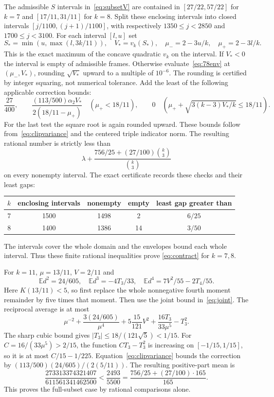\documentclass[11pt]{article}
\newcommand{\EE}{\mathbb E}
\begin{document}
The admissible $S$ intervals in~\eqref{eq:subsetV} are contained in
$[27/22,57/22]$ for $k=7$ and $[17/11,31/11]$ for $k=8$.
Split these enclosing intervals into closed intervals
$[j/1100,(j+1)/1100]$, with respectively
$1350\le j<2850$ and $1700\le j<3100$.
For each interval $[l,u]$ set
\[
 S_* =\min(u,\max(l,3k/11)),\quad
 V_* =v_k(S_*),\quad \mu_-=2-3u/k,\quad\mu_+=2-3l/k.
\]
This is the exact maximum of the concave quadratic $v_k$ on the
interval. If $V_*<0$ the interval is empty of admissible frames.
Otherwise evaluate~\eqref{eq:78env} at $(\mu_-,V_*)$, rounding
$\sqrt{V_*}$ upward to a multiple of $10^{-6}$.
The rounding is certified by integer squaring, not numerical tolerance.
Add the least of the following applicable correction bounds:
\[
 \frac{27}{400},\qquad
 \frac{(113/500)\alpha_2V_*}{2(18/11-\mu_+)}
 \quad(\mu_+<18/11),\qquad
 0\quad\left(\mu_++\sqrt{3(k-3)V_*/k}\le18/11\right).
\]
For the last test the square root is again rounded upward.
These bounds follow from~\eqref{eq:clipvariance} and the centered
triple indicator norm. The resulting rational number is strictly less
than
\begin{equation}\label{eq:78goal}
 \lambda+\frac{756/25+(27/100)\binom k3}{\binom k3}
\end{equation}
on every nonempty interval. The exact certificate records these
checks and their least gaps:
\begin{center}
\begin{tabular}{ccccc}\toprule
$k$&enclosing intervals&nonempty&empty&least gap greater than\\\midrule
7&1500&1498&2&$6/25$\\
8&1400&1386&14&$3/50$\\\bottomrule
\end{tabular}
\end{center}
The intervals cover the whole domain and the envelopes bound each
whole interval. Thus these finite rational inequalities prove
\eqref{eq:contract} for $k=7,8$.

For $k=11$, $\mu=13/11$, $V=2/11$ and
\[
 \EE d^2=24/605,\quad \EE d^3=-4T_3/33,\quad
 \EE d^4=7V^2/55-2T_4/55.
\]
Here $K(13/11)<5$, so first replace the whole nonnegative fourth
moment remainder by five times that moment. Then use the joint bound
in~\eqref{eq:joint}. The reciprocal average is at most
\[
 \mu^{-2}+\frac{3(24/605)}{\mu^4}
 +5\frac{15}{121}V^2+\frac{16T_3}{33\mu^5}-T_3^2.
\]
The sharp cubic bound gives $|T_3|\le18/(121\sqrt5)<1/15$.
For $C=16/(33\mu^5)>2/15$, the function $CT_3-T_3^2$
is increasing on $[-1/15,1/15]$, so it is at most $C/15-1/225$.
Equation~\eqref{eq:clipvariance} bounds the correction by
$(113/500)(24/605)/(2(5/11))$. The resulting positive-part mean is
\[
 \frac{273313374321407}{611561341462500}
 <\frac{2493}{5500}
 =\frac{756/25+(27/100)\cdot165}{165}.
\]
This proves the full-subset case by rational comparisons alone.
\end{document}
